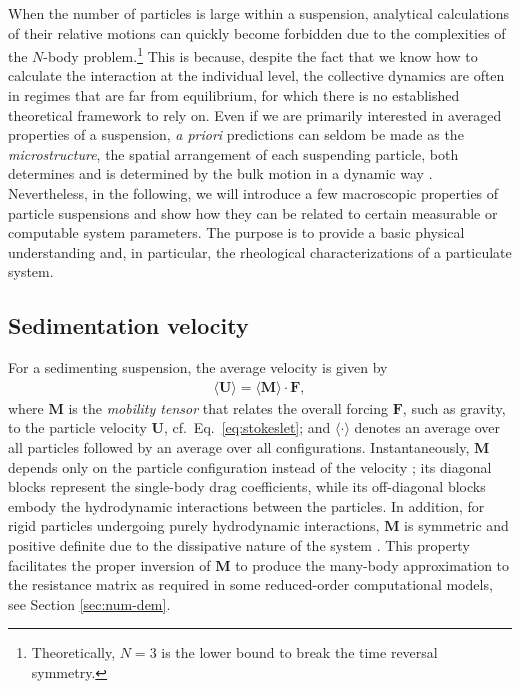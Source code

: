 When the number of particles is large within a suspension, analytical calculations of their relative motions can quickly become forbidden due to the complexities of the $N$-body problem.\footnote{Theoretically, $N = 3$ is the lower bound to break the time reversal symmetry.}
This is because, despite the fact that we know how to calculate the interaction at the individual level, the collective dynamics are often in regimes that are far from equilibrium, for which there is no established theoretical framework to rely on.
Even if we are primarily interested in averaged properties of a suspension, \emph{a priori} predictions can seldom be made as the \emph{microstructure}, \ie the spatial arrangement of each suspending particle, both determines and is determined by the bulk motion in a dynamic way \citep{Brady_Bossis1988}.
Nevertheless, in the following, we will introduce a few macroscopic properties of particle suspensions and show how they can be related to certain measurable or computable system parameters. The purpose is to provide a basic physical understanding and, in particular, the rheological characterizations of a particulate system.

\subsection{Sedimentation velocity}

For a sedimenting suspension, the average velocity is given by
\begin{equation}
 \begin{aligned}
   \langle {\bm U} \rangle = \langle {\bm M} \rangle \cdot {\bm F},
 \end{aligned}
\end{equation}
where ${\bm M}$ is the \emph{mobility tensor} that relates the overall forcing ${\bm F}$, such as gravity, to the particle velocity ${\bm U}$, cf.\ Eq.\ \eqref{eq:stokeslet}; and $\langle \cdot \rangle$ denotes an average over all particles followed by an average over all configurations. Instantaneously, ${\bm M}$ depends only on the particle configuration instead of the velocity \citep{durlofsky_brady_bossis_1987}; its diagonal blocks represent the single-body drag coefficients, while its off-diagonal blocks embody the hydrodynamic interactions between the particles. In addition, for rigid particles undergoing purely hydrodynamic interactions, ${\bm M}$ is symmetric and positive definite due to the dissipative nature of the system \citep{graham_2018}. This property facilitates the proper inversion of ${\bm M}$ to produce the many-body approximation to the resistance matrix as required in some reduced-order computational models, see Section \ref{sec:num-dem}.

